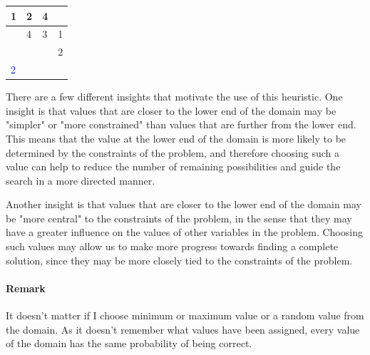 \documentclass[14pt]{scrartcl} %
\begin{document}
 \begin{table}[h]
\begin{tabular}{|l|l|l|l|}
\hline
1 & 2 & 4 &   \\ \hline
  & 4 & 3 & 1 \\ \hline
  &   &   & 2 \\ \hline
\textcolor{blue}{2} &   &   &   \\ \hline
\end{tabular}
\end{table}


There are a few different insights that motivate the use of this heuristic. One insight is that values that are closer to the lower end of the domain may be "simpler" or "more constrained" than values that are further from the lower end. This means that the value at the lower end of the domain is more likely to be determined by the constraints of the problem, and therefore choosing such a value can help to reduce the number of remaining possibilities and guide the search in a more directed manner.

Another insight is that values that are closer to the lower end of the domain may be "more central" to the constraints of the problem, in the sense that they may have a greater influence on the values of other variables in the problem. Choosing such values may allow us to make more progress towards finding a complete solution, since they may be more closely tied to the constraints of the problem.
\paragraph{Remark}
It doesn't matter if I choose minimum or maximum value or a random value from the domain. As it doesn't remember what values have been assigned, every value of the domain has the same probability of being correct.
\pagebreak
\end{document}
